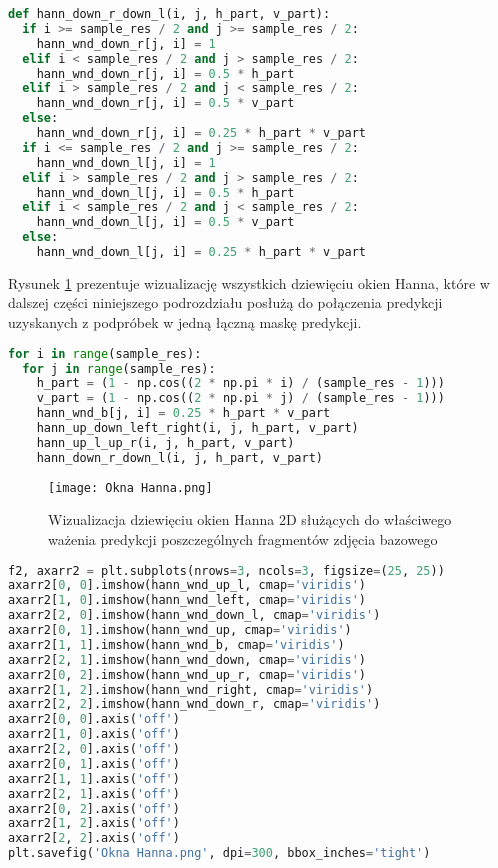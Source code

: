 \cell
\begin{lstlisting}[name=Rozdzial3.1, language=Python]
def hann_down_r_down_l(i, j, h_part, v_part):
  if i >= sample_res / 2 and j >= sample_res / 2:
    hann_wnd_down_r[j, i] = 1
  elif i < sample_res / 2 and j > sample_res / 2:
    hann_wnd_down_r[j, i] = 0.5 * h_part
  elif i > sample_res / 2 and j < sample_res / 2:
    hann_wnd_down_r[j, i] = 0.5 * v_part
  else:
    hann_wnd_down_r[j, i] = 0.25 * h_part * v_part
  if i <= sample_res / 2 and j >= sample_res / 2:
    hann_wnd_down_l[j, i] = 1
  elif i > sample_res / 2 and j > sample_res / 2:
    hann_wnd_down_l[j, i] = 0.5 * h_part
  elif i < sample_res / 2 and j < sample_res / 2:
    hann_wnd_down_l[j, i] = 0.5 * v_part
  else:
    hann_wnd_down_l[j, i] = 0.25 * h_part * v_part
\end{lstlisting}


\cell
Rysunek \ref{fig:hann1} prezentuje wizualizację wszystkich dziewięciu okien Hanna, które w dalszej części niniejszego podrozdziału posłużą do połączenia predykcji uzyskanych z podpróbek w jedną łączną maskę predykcji.
\vspace{1cm}

\cell
\begin{lstlisting}[name=Rozdzial3.1, language=Python]
for i in range(sample_res):
  for j in range(sample_res):
    h_part = (1 - np.cos((2 * np.pi * i) / (sample_res - 1)))
    v_part = (1 - np.cos((2 * np.pi * j) / (sample_res - 1)))
    hann_wnd_b[j, i] = 0.25 * h_part * v_part
    hann_up_down_left_right(i, j, h_part, v_part)
    hann_up_l_up_r(i, j, h_part, v_part)
    hann_down_r_down_l(i, j, h_part, v_part)
\end{lstlisting}

\begin{figure}[!h]
    \centering \texttt{[image: Okna Hanna.png]}
    \captionsetup{format=hang}
    \caption{Wizualizacja dziewięciu okien Hanna 2D służących do właściwego ważenia predykcji poszczególnych fragmentów zdjęcia bazowego}
    \label{fig:hann1}
\end{figure}
\vspace{1cm}

\cell
\begin{lstlisting}[name=Rozdzial3.1, language=Python]
f2, axarr2 = plt.subplots(nrows=3, ncols=3, figsize=(25, 25))
axarr2[0, 0].imshow(hann_wnd_up_l, cmap='viridis')
axarr2[1, 0].imshow(hann_wnd_left, cmap='viridis')
axarr2[2, 0].imshow(hann_wnd_down_l, cmap='viridis')
axarr2[0, 1].imshow(hann_wnd_up, cmap='viridis')
axarr2[1, 1].imshow(hann_wnd_b, cmap='viridis')
axarr2[2, 1].imshow(hann_wnd_down, cmap='viridis')
axarr2[0, 2].imshow(hann_wnd_up_r, cmap='viridis')
axarr2[1, 2].imshow(hann_wnd_right, cmap='viridis')
axarr2[2, 2].imshow(hann_wnd_down_r, cmap='viridis')
axarr2[0, 0].axis('off')
axarr2[1, 0].axis('off')
axarr2[2, 0].axis('off')
axarr2[0, 1].axis('off')
axarr2[1, 1].axis('off')
axarr2[2, 1].axis('off')
axarr2[0, 2].axis('off')
axarr2[1, 2].axis('off')
axarr2[2, 2].axis('off')
plt.savefig('Okna Hanna.png', dpi=300, bbox_inches='tight')
\end{lstlisting}

